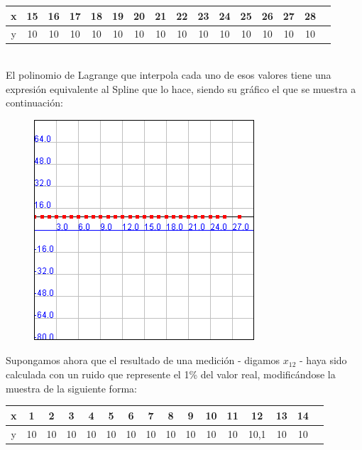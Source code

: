 \documentclass[a4paper]{article}
\begin{document}
\smallskip

\begin{tabular}{  | c || c | c | c | c | c |c | c | c | c | c | c | c | c | c | c |}
 \hline                 
   x&15& 16 & 17 & 18 & 19 & 20 & 21 & 22 & 23 & 24 & 25 & 26 & 27 & 28\\
 \hline    
y & 10 & 10 & 10& 10& 10& 10& 10& 10& 10& 10& 10& 10& 10& 10 \\
 \hline  
 \end{tabular}
\bigskip
\\
El polinomio de Lagrange que interpola cada uno de esos valores tiene una expresión equivalente al Spline que lo hace, siendo su gráfico el que se muestra a continuación:
\smallskip

\begin{figure}[h!]
	\caption{}
	\begin{center}
	\includegraphics[scale=1]{imagenes/LagrangeSplinesCTE}
	\label{LagrangeSplinesCTE}
  \end{center}
\end{figure}

Supongamos ahora que el resultado de una medición - digamos $x_{12}$ - haya sido calculada con un ruido que represente el 1\% del valor real, modificándose la muestra de la siguiente forma:\\

\smallskip

\begin{tabular}{ | c || c | c | c | c | c |c | c | c | c | c | c | c | c | c | c |}
 \hline                 
   x & 1 & 2 & 3 & 4 & 5 & 6 & 7 & 8 & 9 & 10 & 11 & 12 & 13 & 14 \\
 \hline    
y & 10 & 10& 10& 10& 10& 10& 10& 10& 10& 10& 10& 10,1& 10 & 10\\
 \hline  
 \end{tabular}
\end{document}
